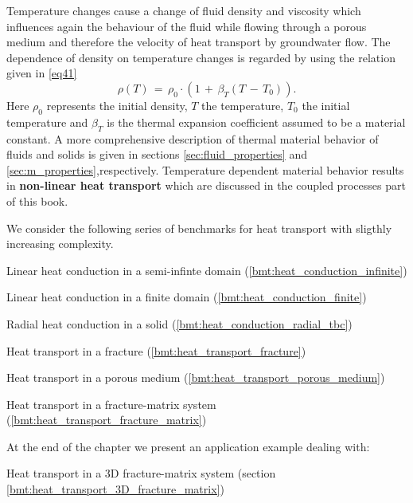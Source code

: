 Temperature changes cause a change of fluid density and viscosity which influences again the behaviour of the fluid while flowing through a porous medium and therefore the velocity of heat transport by groundwater flow.
The dependence of density on temperature changes is regarded by using the relation given in \eqref{eq41}
\begin{equation}
\rho(T)\, = \,\rho_0\cdot\left(1\,+\,\beta_T\left(T\,-\,T_0\right)\right).
\label{eq41}
\end{equation}
Here $\rho_0$ represents the initial density, $T$ the temperature, $T_0$ the initial temperature and $\beta_T$ is the thermal expansion coefficient assumed to be a material constant.
A more comprehensive description of thermal material behavior of fluids and solids is given in sections \ref{sec:fluid_properties} and \ref{sec:m_properties},respectively. 
Temperature dependent material behavior results in \textbf{non-linear heat transport} which are discussed in the coupled processes part of this book.


We consider the following series of benchmarks for heat transport with sligthly increasing complexity.

\begin{compactitem}
	\item Linear heat conduction in a semi-infinte domain (\ref{bmt:heat_conduction_infinite})
	\item Linear heat conduction in a finite domain (\ref{bmt:heat_conduction_finite})
	\item Radial heat conduction in a solid (\ref{bmt:heat_conduction_radial_tbc})
	\item Heat transport in a fracture (\ref{bmt:heat_transport_fracture})
	\item Heat transport in a porous medium (\ref{bmt:heat_transport_porous_medium})
	\item Heat transport in a fracture-matrix system (\ref{bmt:heat_transport_fracture_matrix})
\end{compactitem}


At the end of the chapter we present an application example dealing with:

\begin{compactitem}
	\item Heat transport in a 3D fracture-matrix system (section \ref{bmt:heat_transport_3D_fracture_matrix})
\end{compactitem}
